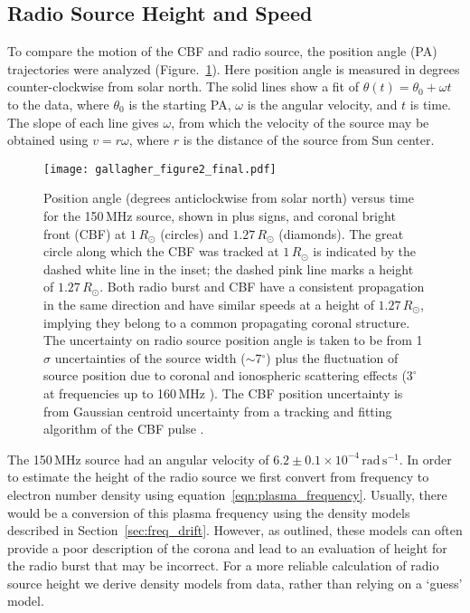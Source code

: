 

\subsection{Radio Source Height and Speed}
To compare the motion of the CBF and radio source, the position angle (PA) trajectories were analyzed (Figure.~\ref{fig:angle_time}). Here position angle is measured in degrees counter-clockwise from solar north. The solid lines show a fit of $\theta(t) = \theta_0 + \omega t$ to the data, where $\theta_0$ is the starting PA, $\omega$ is the angular velocity, and $t$ is time. The slope of each line gives $\omega$, from which the velocity of the source may be obtained using $v=r\omega$, where $r$ is the distance of the source from Sun center. 
\begin{figure}[!t]
\begin{center}
\texttt{[image: gallagher\_figure2\_final.pdf]}
\caption[Radio source and CBF position angle versus time]{Position angle (degrees anticlockwise from solar north) versus time for the 150\,MHz source, shown in plus signs, and coronal bright front (CBF) at $1\,R_{\odot}$ (circles) and $1.27\,R_{\odot}$ (diamonds). The great circle along which the CBF was tracked at $1\,R_{\odot}$ is indicated by the dashed white line in the inset; the dashed pink line marks a height of $1.27\,R_{\odot}$. Both radio burst and CBF have a consistent propagation in the same direction and have similar speeds at a height of $1.27\,R_{\odot}$, implying they belong to a common propagating coronal structure. The uncertainty on radio source position angle is taken to be from 1$\sigma$ uncertainties of the source width ($\sim$7$^{\circ}$) plus the fluctuation of source position due to coronal and ionospheric scattering effects ($3^{\circ}$ at frequencies up to 160\,MHz \citep{stewart1982}). The CBF position uncertainty is from Gaussian centroid uncertainty from a tracking and fitting algorithm of the CBF pulse \citep{long2011a}.}
\label{fig:angle_time}
\end{center}
\end{figure}

The 150\,MHz source had an angular velocity of $6.2\pm0.1\times10^{-4}\,\mathrm{rad\,s^{-1}} $. In order to estimate the height of the radio source we first convert from frequency to electron number density using equation~\ref{eqn:plasma_frequency}. Usually, there would be a conversion of this plasma frequency using the density models described in Section~\ref{sec:freq_drift}. However, as outlined, these models can often provide a poor description of the corona and lead to an evaluation of height for the radio burst that may be incorrect. For a more reliable calculation of radio source height we derive density models from data, rather than relying on a `guess' model.

